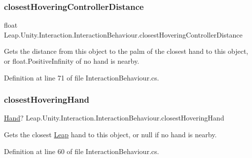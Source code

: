 \subsubsection{\texorpdfstring{closestHoveringControllerDistance}{closestHoveringControllerDistance}}
{\footnotesize\ttfamily float Leap.\+Unity.\+Interaction.\+Interaction\+Behaviour.\+closest\+Hovering\+Controller\+Distance\hspace{0.3cm}{\ttfamily [get]}}



Gets the distance from this object to the palm of the closest hand to this object, or float.\+Positive\+Infinity of no hand is nearby. 



Definition at line 71 of file Interaction\+Behaviour.\+cs.

\mbox{\label{class_leap_1_1_unity_1_1_interaction_1_1_interaction_behaviour_aeee4285667a660b5d1f8c49268eee4a5}} 
\subsubsection{\texorpdfstring{closestHoveringHand}{closestHoveringHand}}
{\footnotesize\ttfamily \mbox{\hyperlink{class_leap_1_1_hand}{Hand}}? Leap.\+Unity.\+Interaction.\+Interaction\+Behaviour.\+closest\+Hovering\+Hand\hspace{0.3cm}{\ttfamily [get]}}



Gets the closest \mbox{\hyperlink{namespace_leap_1_1_unity_1_1_leap}{Leap}} hand to this object, or null if no hand is nearby. 



Definition at line 60 of file Interaction\+Behaviour.\+cs.

\mbox{\label{class_leap_1_1_unity_1_1_interaction_1_1_interaction_behaviour_a1a9f67ccbde4ca471e36e9a0da9a3b83}} 
